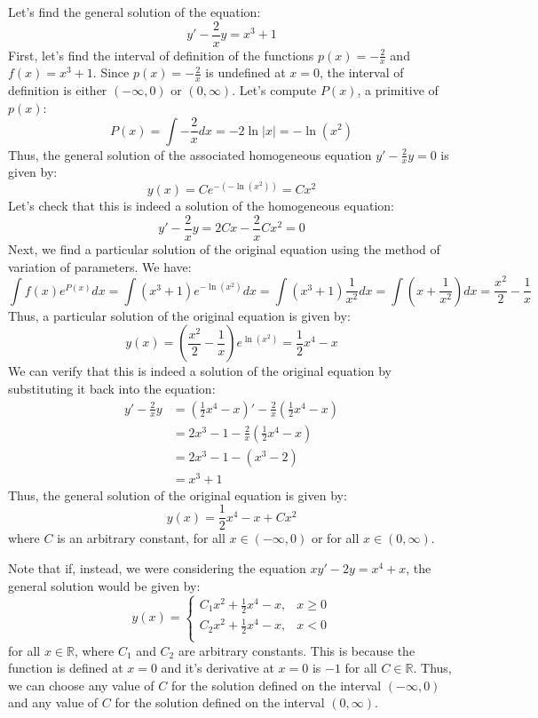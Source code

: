 \begin{eg}
    Let's find the general solution of the equation:
    \[
        y' - \frac{2}{x}y = x^3 + 1
    \]
    First, let's find the interval of definition of the functions $p(x) = -\frac{2}{x}$ and $f(x) = x^3 + 1$. Since $p(x) = -\frac{2}{x}$ is undefined at $x = 0$, the interval of definition is either $(-\infty, 0)$ or $(0, \infty)$. Let's compute $P(x)$, a primitive of $p(x)$:
    \[
        P(x) = \int -\frac{2}{x} dx = -2 \ln |x| = -\ln \left(x^2\right)
    \]
    Thus, the general solution of the associated homogeneous equation $y' - \frac{2}{x} y = 0$ is given by:
    \[
        y(x) = Ce^{- (-\ln \left(x^2\right))} = Cx^2
    \]
    Let's check that this is indeed a solution of the homogeneous equation:
    \[
        y' - \frac{2}{x} y = 2Cx - \frac{2}{x} Cx^2 = 0
    \]
    Next, we find a particular solution of the original equation using the method of variation of parameters. We have:
    \[
        \int f(x) e^{P(x)} dx = \int (x^3 + 1) e^{-\ln \left(x^2\right)} dx = \int (x^3 + 1) \frac{1}{x^2} dx = \int \left(x + \frac{1}{x^2}\right) dx = \frac{x^2}{2} - \frac{1}{x}
    \]
    Thus, a particular solution of the original equation is given by:
    \[
        y(x) = \left(\frac{x^2}{2} - \frac{1}{x}\right) e^{\ln \left(x^2\right)} = \frac{1}{2} x^4 - x
    \]
    We can verify that this is indeed a solution of the original equation by substituting it back into the equation:
    \begin{align*}
        y' - \frac{2}{x} y & = \left(\frac{1}{2} x^4 - x\right)' - \frac{2}{x} \left(\frac{1}{2} x^4 - x\right) \\
        & = 2x^3 - 1 - \frac{2}{x} \left(\frac{1}{2} x^4 - x\right) \\
        & = 2x^3 - 1 - \left(x^3 - 2\right) \\
        & = x^3 + 1
    \end{align*}
    Thus, the general solution of the original equation is given by:
    \[
        y(x) = \frac{1}{2} x^4 - x + Cx^2
    \]
    where $C$ is an arbitrary constant, for all $x \in (-\infty, 0)$ or for all $x \in (0, \infty)$.
\end{eg}
Note that if, instead, we were considering the equation $xy' - 2y = x^4 + x$, the general solution would be given by:
\[
    y(x) = \begin{cases}
        C_1 x^2 + \frac{1}{2}x^4 - x, & x \geq 0 \\
        C_2 x^2 + \frac{1}{2}x^4 - x, & x < 0 \\
    \end{cases}
\]
for all $x \in \mathbb{R}$, where $C_1$ and $C_2$ are arbitrary constants. This is because the function is defined at $x = 0$ and it's derivative at $x = 0$ is $-1$ for all $C \in \mathbb{R}$. Thus, we can choose any value of $C$ for the solution defined on the interval $(-\infty, 0)$ and any value of $C$ for the solution defined on the interval $(0, \infty)$.


